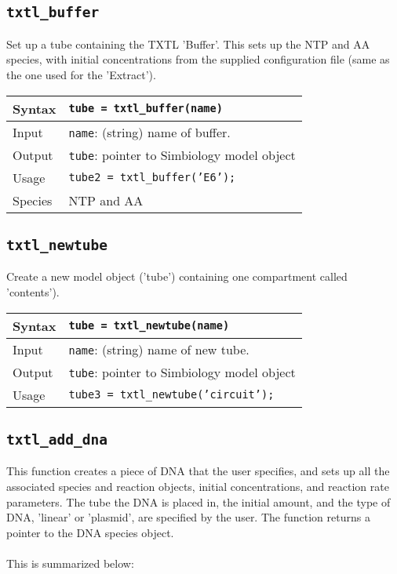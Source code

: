 		\subsection*{\texttt{txtl\_buffer}}
		Set up a tube containing the TXTL 'Buffer'. This sets up the NTP and AA species, with initial concentrations from the supplied configuration file (same as the one used for the 'Extract'). \\
					
			\begin{tabular}{p{2cm}|p{13cm}}
			Syntax & \texttt{tube = txtl\_buffer(name)}\\ \hline
			Input & \texttt{name}: (string) name of buffer. \\ \hline
			Output & \texttt{tube}: pointer to Simbiology model object\\ \hline
			Usage & \texttt{tube2 = txtl\_buffer('E6');}\\ \hline
			Species & NTP and AA \\
			\end{tabular}

		\subsection*{\texttt{txtl\_newtube}}	
		Create a new model object ('tube') containing one compartment called 'contents'). \\	
			
			\begin{tabular}{p{2cm}|p{13cm}}
			Syntax & \texttt{tube = txtl\_newtube(name)}\\ \hline
			Input & \texttt{name}: (string) name of new tube. \\ \hline
			Output & \texttt{tube}: pointer to Simbiology model object\\ \hline
			Usage & \texttt{tube3 = txtl\_newtube('circuit');}\\
			\end{tabular}	

		\subsection*{\texttt{txtl\_add\_dna}}
			This function creates a piece of DNA that the user specifies, and sets up all the associated species and reaction objects, initial concentrations, and reaction rate parameters. The tube the DNA is placed in, the initial amount, and the type of DNA, 'linear' or 'plasmid', are specified by the user. The function returns a pointer to the DNA species object. \\ 
			\\
			This is summarized below:	
			

